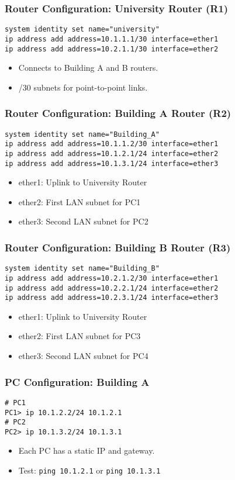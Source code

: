\documentclass{beamer}
\begin{document}
\begin{frame}[fragile]
\frametitle{Router Configuration: University Router (R1)}
\begin{lstlisting}
system identity set name="university"
ip address add address=10.1.1.1/30 interface=ether1
ip address add address=10.2.1.1/30 interface=ether2
\end{lstlisting}
\begin{itemize}
    \item Connects to Building A and B routers.
    \item /30 subnets for point-to-point links.
\end{itemize}
\end{frame}

\begin{frame}[fragile]
\frametitle{Router Configuration: Building A Router (R2)}
\begin{lstlisting}
system identity set name="Building_A"
ip address add address=10.1.1.2/30 interface=ether1
ip address add address=10.1.2.1/24 interface=ether2 
ip address add address=10.1.3.1/24 interface=ether3
\end{lstlisting}
\begin{itemize}
    \item ether1: Uplink to University Router
    \item ether2: First LAN subnet for PC1
    \item ether3: Second LAN subnet for PC2
\end{itemize}
\end{frame}

\begin{frame}[fragile]
\frametitle{Router Configuration: Building B Router (R3)}
\begin{lstlisting}
system identity set name="Building_B"
ip address add address=10.2.1.2/30 interface=ether1
ip address add address=10.2.2.1/24 interface=ether2    
ip address add address=10.2.3.1/24 interface=ether3
\end{lstlisting}
\begin{itemize}
    \item ether1: Uplink to University Router
    \item ether2: First LAN subnet for PC3
    \item ether3: Second LAN subnet for PC4
\end{itemize}
\end{frame}

\begin{frame}[fragile]
\frametitle{PC Configuration: Building A}
\begin{lstlisting}
# PC1
PC1> ip 10.1.2.2/24 10.1.2.1
# PC2
PC2> ip 10.1.3.2/24 10.1.3.1
\end{lstlisting}
\begin{itemize}
    \item Each PC has a static IP and gateway.
    \item Test: \texttt{ping 10.1.2.1} or \texttt{ping 10.1.3.1}
\end{itemize}
\end{frame}
\end{document}
